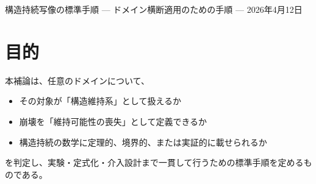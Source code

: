 \documentclass[12pt,a4paper]{article}
\begin{document}
\PaperTitleBlock
  {構造持続写像の標準手順}
  {— ドメイン横断適用のための手順 —}
  {2026年4月12日}

\begin{abstract}
本補論は、構造持続の最小形式

\[
S = Me^{-L}
\]

を個別ドメインへ写像するための標準手順を与える。目的は、任意の対象について、それが構造維持系として扱えるか、崩壊を維持可能性の喪失として定義できるか、そしてそのドメインについて、定理、境界、または実証のいずれの強さで構造持続の数学に載せられるかを、同じ手順で判定できるようにすることである。

本手順は、対象構造、維持条件、有効選択肢空間、制約集合、累積構造消耗 L、余力 μ、初期有効選択肢多様性 N\_eff\^{}(0) を順に定義し、仕様固定構造層、条件付き構造埋め込み層、構造推定層のいずれかへ位置づける。さらに、反証条件の事前固定、基準モデルとの比較、予測頑健性テスト、介入設計までを一つの流れとして与える。これにより、ドメインごとに異なる語で語られてきた崩壊や劣化を、共通の骨格のもとで比較・検証するための標準手順を与える。

本補論で最も重要な運用規律は、「探索的に写像を作ってはならない」という禁止ではなく、「写像発見と検証を混同しない」という分離である。現実ドメインでは、維持対象、測度、構造消耗指標、回復指標を探索的に発見する段階がありうる。この段階の産物は candidate signal または candidate mapping であり、support ではない。support と呼べるのは、写像、指標、split、metric、baseline を凍結した後に、holdout / future / fresh archive / outside rerun で予測力の増分を示した場合に限る。探索で外れた候補、凍結後に外れた写像、baseline と重複していた追加軸も、失敗として捨てず、次の写像発見に使える台帳として記録する。
\end{abstract}

\section{目的}\label{ux76eeux7684}

本補論は、任意のドメインについて、

\begin{itemize}
\tightlist
\item
  その対象が「構造維持系」として扱えるか
\item
  崩壊を「維持可能性の喪失」として定義できるか
\item
  構造持続の数学に定理的、境界的、または実証的に載せられるか
\end{itemize}

を判定し、実験・定式化・介入設計まで一貫して行うための標準手順を定めるものである。
\end{document}

